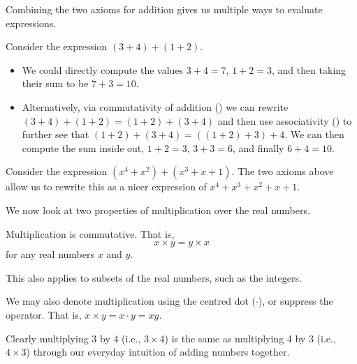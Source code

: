 Combining the two axioms for addition gives us multiple ways to evaluate expressions.
\begin{example}
    Consider the expression $(3 + 4) + (1 + 2)$.
    \begin{itemize}
        \item We could directly compute the values $3 + 4 = 7$, $1 + 2 = 3$, and then taking their sum to be $7 + 3 = 10$.
        \item Alternatively, via commutativity of addition () we can rewrite $(3 + 4) + (1 + 2) = (1+2)+(3+4)$ and then use associativity () to further see that $(1+2)+(3+4) = ((1+2)+3)+4$. We can then compute the sum inside out, $1 + 2 = 3$, $3 + 3 = 6$, and finally $6 + 4 = 10$.
    \end{itemize}
\end{example}
\begin{example}
    Consider the expression $(x^4 + x^2) + (x^3 + x + 1)$. The two axioms above allow us to rewrite this as a nicer expression of $x^4 + x^3 + x^2 + x + 1$.
\end{example}

We now look at two properties of multiplication over the real numbers.
\begin{axiom}\label{axiom-multiplication-is-commutative}
    Multiplication is commutative. That is,
    \[
        x \times y = y \times x
    \]
    for any real numbers $x$ and $y$.
\end{axiom}
\begin{remark}
    This also applies to subsets of the real numbers, such as the integers.
\end{remark}
\begin{remark}
    We may also denote multiplication using the centred dot ($\cdot$), or suppress the operator. That is, $x\times y = x\cdot y = xy$.
\end{remark}
\begin{example}
    Clearly multiplying 3 by 4 (i.e., $3 \times 4$) is the same as multiplying 4 by 3 (i.e., $4 \times 3$) through our everyday intuition of adding numbers together.
\end{example}

